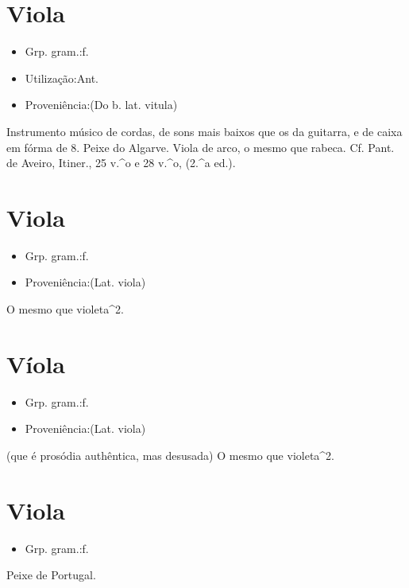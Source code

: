 \documentclass{article}
\begin{document}
\section{Viola}
\begin{itemize}
\item {Grp. gram.:f.}
\end{itemize}
\begin{itemize}
\item {Utilização:Ant.}
\end{itemize}
\begin{itemize}
\item {Proveniência:(Do b. lat. \textunderscore vitula\textunderscore )}
\end{itemize}
Instrumento músico de cordas, de sons mais baixos que os da guitarra, e de caixa em fórma de 8.
Peixe do Algarve.
\textunderscore Viola de arco\textunderscore , o mesmo que \textunderscore rabeca\textunderscore . Cf. Pant. de Aveiro, \textunderscore Itiner.\textunderscore , 25 v.^o e 28 v.^o, (2.^a ed.).
\section{Viola}
\begin{itemize}
\item {Grp. gram.:f.}
\end{itemize}
\begin{itemize}
\item {Proveniência:(Lat. \textunderscore viola\textunderscore )}
\end{itemize}
O mesmo que \textunderscore violeta\textunderscore ^2.
\section{Víola}
\begin{itemize}
\item {Grp. gram.:f.}
\end{itemize}
\begin{itemize}
\item {Proveniência:(Lat. \textunderscore viola\textunderscore )}
\end{itemize}
(que é prosódia authêntica, mas desusada)
O mesmo que \textunderscore violeta\textunderscore ^2.
\section{Viola}
\begin{itemize}
\item {Grp. gram.:f.}
\end{itemize}
Peixe de Portugal.
\end{document}
